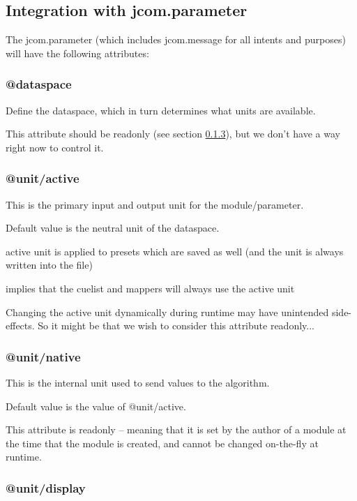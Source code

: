 \documentclass[]{article}
\begin{document}
\subsection{Integration with jcom.parameter}

The jcom.parameter (which includes jcom.message for all intents and purposes) will have the following attributes:


\subsubsection{@dataspace}

Define the dataspace, which in turn determines what units are available.

This attribute should be readonly (see section \ref{sec:unit/native}), but we don't have a way right now to control it. 


\subsubsection{@unit/active}

This is the primary input and output unit for the module/parameter.

Default value is the neutral unit of the dataspace.

active unit is applied to presets which are saved as well 
  (and the unit is always written into the file)

implies that the cuelist and mappers will always use the active unit

Changing the active unit dynamically during runtime may have unintended side-effects.  So it might be that we wish to consider this attribute readonly...


\subsubsection{@unit/native}    \label{sec:unit/native}

This is the internal unit used to send values to the algorithm.

Default value is the value of @unit/active.

This attribute is readonly -- meaning that it is set by the author of a module at the time that the module is created, and cannot be changed on-the-fly at runtime.


\subsubsection{@unit/display}
\end{document}
